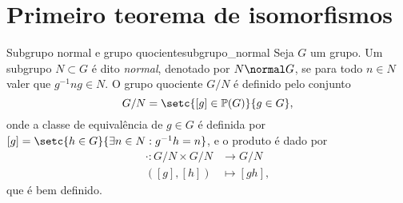 \section{Primeiro teorema de isomorfismos}
\begin{definition}{Subgrupo normal e grupo quociente}{subgrupo_normal}
    Seja \(G\) um grupo. Um subgrupo \(N \subset G\) é dito \emph{normal}, denotado por \(N \normal G\), se para todo \(n \in N\) valer que \(g^{-1} n g \in N\). O grupo quociente \(G/N\) é definido pelo conjunto
    \begin{equation*}
        G / N = \setc{[g] \in \mathbb{P}(G)}{g \in G},
    \end{equation*}
    onde a classe de equivalência de \(g \in G\) é definida por \([g] = \setc{h \in G}{\exists n \in N : g^{-1}h = n}\), e o produto é dado por
    \begin{align*}
        \cdot : G/N \times G/N &\to G/N\\
                     ([g],[h]) &\mapsto [g h],
    \end{align*}
    que é bem definido.
\end{definition}

